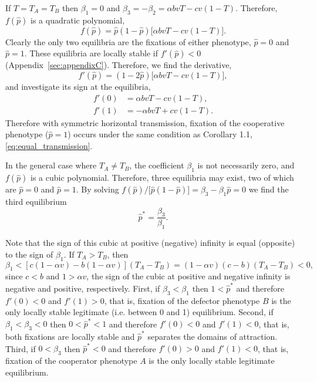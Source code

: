 \documentclass[12pt]{extarticle}
\begin{document}
{If $T=T_A=T_B$ then $\beta_1=0$ and $\beta_3=-\beta_2=\alpha b vT -cv(1-T)$. 
Therefore, $f(\hat{p})$ is a quadratic polynomial,
\begin{equation} \label{eq:equal_horizontal_transmission}
  f(\hat{p}) = \hat{p}(1-\hat{p})\big[\alpha bvT - cv(1-T)\big].
\end{equation}
Clearly the only two equilibria are the fixations of either phenotype, $\hat{p} =  0$ and $\hat{p} = 1$.
These equilibria are locally stable if $f'(\hat{p})<0$ (Appendix~\autoref{sec:appendixC}).
Therefore, we find the derivative,
\begin{equation}
f'(\hat{p})=(1-2\hat{p})\big[\alpha bvT - cv(1-T)\big],
\end{equation}
and investigate its sign at the equilibria,
\begin{equation} \label{eq:derivative_of_phattag-phat}
\begin{aligned}
	f'(0) &=	\alpha bvT - cv(1-T), \\
	f'(1) &=	-\alpha bvT + cv(1-T).
\end{aligned}
\end{equation}
Therefore with symmetric horizontal transmission, fixation of the cooperative phenotype ($\hat{p}=1$) occurs under the same condition as Corollary 1.1, \autoref{eq:equal_transmission}.


In the general case where $T_A \neq T_B$, the coefficient $\beta_1$ is not necessarily zero, and $f(\hat{p})$ is a cubic polynomial.
Therefore, three equilibria may exist, two of which are
$\hat{p} = 0 $ and $\hat{p} = 1$.
By solving $f(\hat{p})/\big[\hat{p}(1-\hat{p})\big] = \beta_3 -\beta_1 \hat{p} = 0$ we  find the third equilibrium
\begin{equation} \label{eq:oblique_and_vertic_result}
  \hat{p}^* =  
  \frac{\beta_3}{\beta_1}.
\end{equation}

Note that the sign of this cubic at positive (negative) infinity is equal (opposite) to the sign of $\beta_1$. 
If $T_A>T_B$, then 
\begin{equation} \label{eq:beta1}
   \beta_1 < [c(1-\alpha v) - b(1-\alpha v)] (T_A-T_B) 
   = (1-\alpha v)(c-b)(T_A-T_B) < 0 ,
 \end{equation}
since $c<b$ and $1>\alpha v$, the sign of the cubic at positive and negative infinity is negative and positive, respectively.
First, if $\beta_3<\beta_1$ then 
$1<\hat{p}^*$ and therefore $f'(0)<0$ and $f'(1)>0$, that is, fixation of the defector phenotype $B$ is the only locally stable legitimate (i.e. between 0 and 1) equilibrium.
Second, if $\beta_1<\beta_3<0$ then 
$0<\hat{p}^*<1$ and therefore $f'(0)<0$ and $f'(1)<0$, that is, both fixations are locally stable and $\hat{p}^*$ separates the domains of attraction.
Third, if $0<\beta_3$ then 
$\hat{p}^*<0$ and therefore $f'(0)>0$ and $f'(1)<0$, that is, fixation of the cooperator phenotype $A$ is the only locally stable legitimate equilibrium.

}
\end{document}
